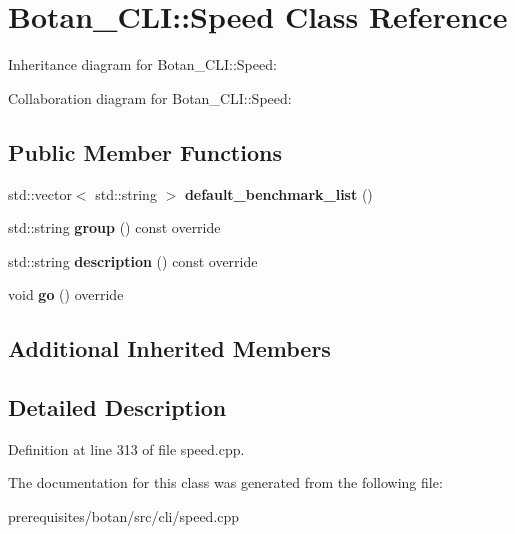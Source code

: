 \hypertarget{class_botan___c_l_i_1_1_speed}{}\section{Botan\+\_\+\+C\+LI\+:\+:Speed Class Reference}
\label{class_botan___c_l_i_1_1_speed}


Inheritance diagram for Botan\+\_\+\+C\+LI\+:\+:Speed\+:


Collaboration diagram for Botan\+\_\+\+C\+LI\+:\+:Speed\+:
\subsection*{Public Member Functions}
\begin{DoxyCompactItemize}
\item 
\mbox{\label{class_botan___c_l_i_1_1_speed_a546197bb05bfd98ad652667db1117c52}} 
std\+::vector$<$ std\+::string $>$ {\bfseries default\+\_\+benchmark\+\_\+list} ()
\item 
\mbox{\label{class_botan___c_l_i_1_1_speed_a99a9514fbc720aedc0b48101f628ec3f}} 
std\+::string {\bfseries group} () const override
\item 
\mbox{\label{class_botan___c_l_i_1_1_speed_aa2773a53af6882b0ce2af2e3cb000be7}} 
std\+::string {\bfseries description} () const override
\item 
\mbox{\label{class_botan___c_l_i_1_1_speed_a967890420623a5406da46b199b87539b}} 
void {\bfseries go} () override
\end{DoxyCompactItemize}
\subsection*{Additional Inherited Members}


\subsection{Detailed Description}


Definition at line 313 of file speed.\+cpp.



The documentation for this class was generated from the following file\+:\begin{DoxyCompactItemize}
\item 
prerequisites/botan/src/cli/speed.\+cpp\end{DoxyCompactItemize}
